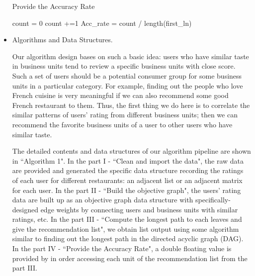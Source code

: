 \begin{itemize}
\begin{algorithm}
\begin{algorithmic}
\Statex
\State Provide the Accuracy Rate

    count = 0
                     count +=1
            \EndIf
    \EndFor
\Return   Acc\_rate = count / length(first\_ln)        
\EndProcedure
\end{algorithmic}
\end{algorithm}

\item{Algorithms and Data Structures. }

Our algorithm design bases on such a basic idea: users who have similar taste in business units tend to review a specific business units with close score. Such a set of users should be a potential consumer group for some business units in a particular category. For example, finding out the people who love French cuisine is very meaningful if we can also recommend some good French restaurant to them. Thus, the first thing we do here is to correlate the similar patterns of users' rating from different business units; then we can recommend the favorite business units of a user to other users who have similar taste. 

The detailed contents and data structures of our algorithm pipeline are shown in ``Algorithm 1". In the part I - ``Clean and import the data", the raw data are provided and generated the specific data structure recording the ratings of each user for different restaurants: an adjacent list or an adjacent matrix for each user. In the part II - ``Build the objective graph", the users' rating data are built up as an objective graph data structure with specifically-designed edge weights by connecting users and business units with similar ratings, etc. In the part III - ``Compute the longest path to each leaves and give the recommendation list", we obtain list output using some algorithm similar to finding out the longest path in the directed acyclic graph (DAG). In the part IV - ``Provide the Accuracy Rate", a double floating value is provided by in order accessing each unit of the recommendation list from the part III.


\end{itemize}
